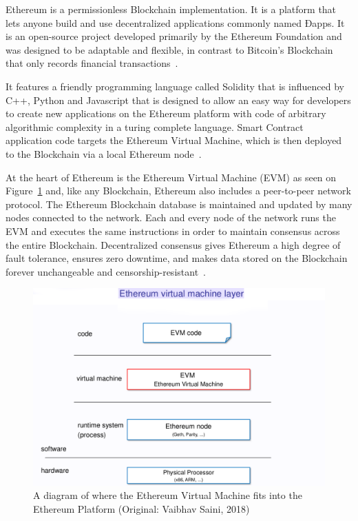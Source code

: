 Ethereum is a permissionless Blockchain implementation. It is a platform that
lets anyone build and use decentralized applications commonly named Ðapps. It
is an open-source project developed primarily by the Ethereum Foundation and
was designed to be adaptable and flexible, in contrast to Bitcoin's Blockchain
that only records financial transactions~\cite{EthereumDocs2018}.

It features a friendly programming language called Solidity that is influenced
by C++, Python and Javascript that is designed to allow an easy way for
developers to create new applications on the Ethereum platform with code of
arbitrary algorithmic complexity in a turing complete language. Smart Contract
application code targets the Ethereum Virtual Machine, which is then deployed
to the Blockchain via a local Ethereum node~\cite{Wood2017,Barclay2017}.

At the heart of Ethereum is the Ethereum Virtual Machine (EVM) as seen on
Figure~\ref{fig:evm} and, like any Blockchain, Ethereum also includes a
peer-to-peer network protocol. The Ethereum Blockchain database is maintained
and updated by many nodes connected to the network. Each and every node of the
network runs the EVM and executes the same instructions in order to maintain
consensus across the entire Blockchain. Decentralized consensus gives Ethereum
a high degree of fault tolerance, ensures zero downtime, and makes data stored
on the Blockchain forever unchangeable and
censorship-resistant~\cite{EthereumDocs2018}.

\begin{figure}[h]
  \centering
  \includegraphics[width=1\linewidth]{imgs/ethereumVirtualMachine.png}
  \caption{\label{fig:evm} A diagram of where the Ethereum Virtual Machine fits
  into the Ethereum Platform (Original: Vaibhav Saini, 2018)}
\end{figure}

